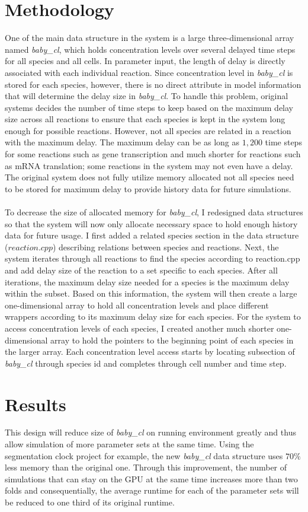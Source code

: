\documentclass[../thesis.tex]{subfiles}
\begin{document}
\section{Methodology}
One of the main data structure in the system is a large three-dimensional array named \textit{baby\_cl}, which holds concentration levels over several delayed time steps for all species and all cells. In parameter input, the length of delay is directly associated with each individual reaction. Since concentration level in \textit{baby\_cl} is stored for each species, however, there is no direct attribute in model information that will determine the delay size in \textit{baby\_cl}. To handle this problem, original systems decides the number of time steps to keep based on the maximum delay size across all reactions to ensure that each species is kept in the system long enough for possible reactions. However, not all species are related in a reaction with the maximum delay. The maximum delay can be as long as $1,200$ time steps for some reactions such as gene transcription and much shorter for reactions such as mRNA translation; some reactions in the system may not even have a delay. The original system does not fully utilize memory allocated not all species need to be stored for maximum delay to provide history data for future simulations. \\
\\
To decrease the size of allocated memory for \textit{baby\_cl}, I redesigned data structures so that the system will now only allocate necessary space to hold enough history data for future usage. I first added a related species section in the data structure ($reaction.cpp$) describing relations between species and reactions. Next, the system iterates through all reactions to find the species according to reaction.cpp and add delay size of the reaction to a set specific to each species. After all iterations, the maximum delay size needed for a species is the maximum delay within the subset. Based on this information, the system will then create a large one-dimensional array to hold all concentration levels and place different wrappers according to its maximum delay size for each species. For the system to access concentration levels of each species, I created another much shorter one-dimensional array to hold the pointers to the beginning point of each species in the larger array. Each concentration level access starts by locating subsection of \textit{baby\_cl} through species id and completes through cell number and time step. 
\section{Results}
This design will reduce size of \textit{baby\_cl} on running environment greatly and thus allow simulation of more parameter sets at the same time. Using the segmentation clock project for example, the new \textit{baby\_cl} data structure uses $70\%$ less memory than the original one. Through this improvement, the number of simulations that can stay on the GPU at the same time increases more than two folds and consequentially, the average runtime for each of the parameter sets will be reduced to one third of its original runtime. 
\end{document}
